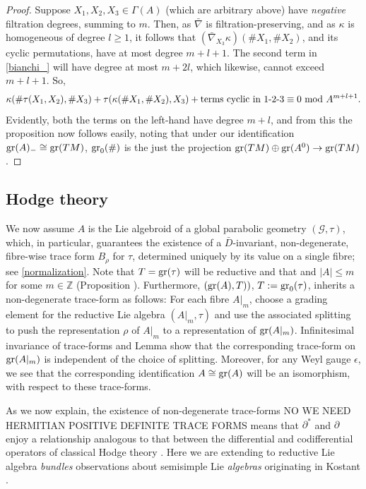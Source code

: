 \documentclass[leqno,12pt]{amsart} %
\begin{document}
\begin{proof}
  Suppose $X_1, X_2, X_3 \in \Gamma(A)$ (which are arbitrary above) have {\em negative}
  filtration degrees, summing to $m$. Then, as $\bar\nabla $ is filtration-preserving, and
  as $\kappa $ is homogeneous of degree $l\ge 1$, it follows that
  $(\bar\nabla_{X_3}\kappa)(\#X_1, \#X_2)$, and its cyclic permutations, have at most
  degree $m + l + 1$. The second term in \eqref{bianchi_} will have degree at most
  $m + 2l$, which likewise, cannot exceed $ m + l + 1$. So,
  \begin{equation*}
    \kappa(\# \tau(X_1, X_2), \#X_3) + \tau(\kappa(\#X_1, \#X_2), X_3) +
    \text{terms cyclic in 1-2-3} \equiv 0 ~\mathrm{mod}~ A^{m + l + 1}.
  \end{equation*}
  Evidently, both the terms on the left-hand have degree $m + l$, and from this the
  proposition now follows easily, noting that under our identification
  $\operatorname{\operatorname{gr}}(A)_{-}\cong \operatorname{\operatorname{gr}}(TM)$, $\operatorname{\operatorname{gr}}_0(\#)$ is the just the projection
  $\operatorname{\operatorname{gr}}(TM) \oplus \operatorname{\operatorname{gr}}(A^0) \rightarrow \operatorname{\operatorname{gr}}(TM)$.
\end{proof}

\subsection{Hodge theory}\label{hodge}
We now assume $A$ is the Lie algebroid of a global parabolic geometry
$({\mathcal G}, \tau)$, which, in particular, guarantees the existence of a
$\bar D$-invariant, non-degenerate, fibre-wise trace form $B_\rho$ for $\tau$, determined
uniquely by its value on a single fibre; see \ref{normalization}. Note that
$T=\operatorname{\operatorname{gr}} (\tau)$ will be reductive and that and $|A| \le m$ for some $m \in {\mathbb Z}$
(Proposition ). Furthermore, $(\operatorname{\operatorname{gr}}(A), T))$,
$T:=\operatorname{\operatorname{gr}}_0(\tau)$, inherits a non-degenerate trace-form as follows: For each fibre
$A|_m$, choose a grading element for the reductive Lie algebra $(A|_m, \tau)$ and use the
associated splitting to push the representation $\rho $ of $A|_m$ to a representation of
$\operatorname{\operatorname{gr}}(A|_m)$. Infinitesimal invariance of trace-forms and Lemma
 show that the corresponding trace-form on $\operatorname{\operatorname{gr}}(A|_m)$
is independent of the choice of splitting. Moreover, for any Weyl gauge $\epsilon $, we
see that the corresponding identification $A \cong \operatorname{\operatorname{gr}}(A)$ will be an isomorphism,
with respect to these trace-forms.

As we now explain, the existence of non-degenerate trace-forms NO WE NEED HERMITIAN
POSITIVE DEFINITE TRACE FORMS means that $\partial^*$ and $\partial $ enjoy a relationship
analogous to that between the differential and codifferential operators of classical Hodge
theory \cite{Warner_83}. Here we are extending to reductive Lie algebra {\em bundles}
observations about semisimple Lie {\em algebras} originating in Kostant \cite{Kostant_61}.
\end{document}
